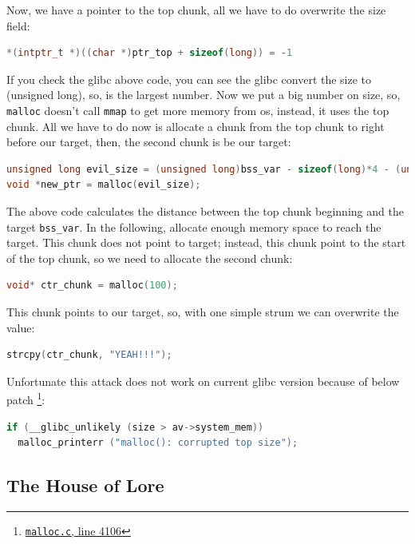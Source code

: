 \documentclass{masterthesis}
\newcommand*\libc{glibc}
\newcommand*\mallocc{\lstinline{malloc}\xspace}
\newcommand*\mmapc{\lstinline{mmap}\xspace}
\begin{document}
Now, we have a pointer to the top chunk, all we have to do overwrite the size field:

\begin{lstlisting}[language=c,frame=tlrb]
*(intptr_t *)((char *)ptr_top + sizeof(long)) = -1
\end{lstlisting}

If you check the \libc{} above code, you can see the \libc{} convert the size to (unsigned long), so,  is the largest number. Now we put a big number on size, so, \mallocc{} doesn’t call \mmapc{} to get more memory from os, instead, it uses the top chunk. All we have to do now is allocate a chunk from the top chunk to right before our target, then, the second chunk is be our target:

\begin{lstlisting}[language=c,frame=tlrb]
unsigned long evil_size = (unsigned long)bss_var - sizeof(long)*4 - (unsigned long)ptr_top;
void *new_ptr = malloc(evil_size);
\end{lstlisting}

The above code calculates the distance between the top chunk beginning and the target \lstinline{bss_var}. In the following, allocate enough memory space to reach the target. This chunk does not point to target; instead, this chunk point to the start of the top chunk, so we need to allocate the second chunk:

\begin{lstlisting}[language=c,frame=tlrb]
void* ctr_chunk = malloc(100);
\end{lstlisting}

This chunk points to our target, so, with one simple strum we can overwrite the value:

\begin{lstlisting}[language=c,frame=tlrb]
strcpy(ctr_chunk, "YEAH!!!");
\end{lstlisting}

Unfortunate this attack does not work on current \libc{} version because of below patch \footnote{\href{https://sourceware.org/git/?p=glibc.git;a=blob;f=malloc/malloc.c;h=f7cd29bc2f93e1082ee77800bd64a4b2a2897055;hb=9ea3686266dca3f004ba874745a4087a89682617\#l4106}{\texttt{malloc.c}, line 4106}}:
\begin{lstlisting}[language=c,frame=tlrb]
if (__glibc_unlikely (size > av->system_mem))
  malloc_printerr ("malloc(): corrupted top size");
\end{lstlisting}

\subsection{The House of Lore}
\end{document}
